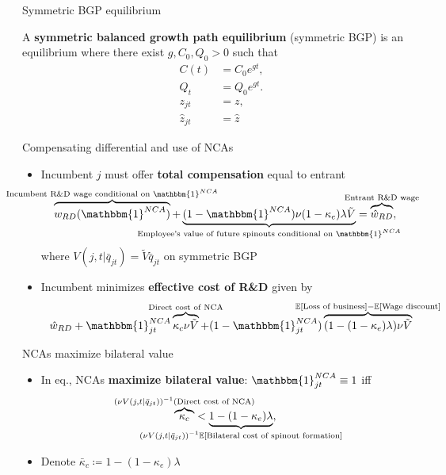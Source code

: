 \documentclass[english,usenames,dvipsnames]{beamer}
\begin{document}
\begin{frame}{Symmetric BGP equilibrium}\label{definition:symmetric_bgp}
	\hyperlink{characterizing_BGP}{}
	\begin{definition}
	A \textbf{symmetric balanced growth path equilibrium} (symmetric BGP) is an equilibrium where there exist $g, C_0, Q_0 > 0$ such that
	\begin{align*}
		C(t) &= C_0 e^{gt}, \\
		Q_t &= Q_0 e^{gt}. \\
		z_{jt} &= z, \\
		\hat{z}_{jt} &= \hat{z}
	\end{align*}
	\end{definition}
\end{frame}


\begin{frame}{Compensating differential and use of NCAs}\label{use_of_ncas_details}
	\begin{itemize}
		\item<+-> Incumbent $j$ must offer \alert{\textbf{total compensation}} equal to entrant
		\begin{align*}
			\overbrace{w_{RD}(\mathbbm{1}^{NCA})}^{\mathclap{\text{Incumbent R\&D wage conditional on }\mathbbm{1}^{NCA}}} + \underbrace{(1-\mathbbm{1}^{NCA}) \nu (1-\kappa_e) \lambda \tilde{V}}_{\mathclap{\text{Employee's value of future spinouts conditional on }\mathbbm{1}^{NCA}}} &= \overbrace{\hat{w}_{RD}}^{\mathclap{\text{Entrant R\&D wage}}},
		\end{align*}
		where $V(j,t|\bar{q}_{jt}) = \tilde{V} \bar{q}_{jt}$ on symmetric BGP
		\medskip
		\item<+-> Incumbent minimizes \alert{\textbf{effective cost of R\&D}} given by
		\begin{align*}
			\hat{w}_{RD} + \mathbbm{1}^{NCA}_{jt} \overbrace{ \kappa_c \nu \tilde{V}}^{\mathclap{\text{Direct cost of NCA}}} + (1- \mathbbm{1}^{NCA}_{jt}) \overbrace{(1 - (1-\kappa_e) \lambda) \nu \tilde{V}}^{\mathclap{\mathbb{E}[\text{Loss of business}] - \mathbb{E}[\text{Wage discount}]}} 
		\end{align*}
	\end{itemize}
\end{frame}

\begin{frame}{NCAs maximize bilateral value}\label{use_of_ncas}
	\begin{itemize}
		\item In eq., NCAs \alert{\textbf{maximize bilateral value}}: $\mathbbm{1}^{NCA}_{jt} \equiv 1$ iff
		\begin{align*}
		\overbrace{\kappa_c}^{\mathclap{(\nu V(j,t|\bar{q}_{jt}))^{-1} (\text{Direct cost of NCA})}} &< \underbrace{1 - (1-\kappa_e) \lambda}_{\mathclap{(\nu V(j,t|\bar{q}_{jt}))^{-1}\mathbb{E}[\text{Bilateral cost of spinout formation}]}},
		\end{align*}
		\item Denote $\bar{\kappa}_c \coloneqq 1 - (1-\kappa_e) \lambda$
	\end{itemize}
\end{frame}
\end{document}
